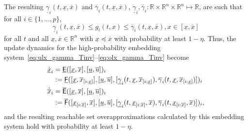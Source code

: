 \documentclass{IEEEojcsys}
\newcommand{\ul}{\underline}
\newcommand{\ol}{\overline}
\begin{document}
The resulting $\ul{\gamma}_i(t, \ul{x}, \ol{x})$ and $\ol{\gamma}_i(t, \ul{x}, \ol{x})$, $\ul{\gamma}_i, \ol{\gamma}_i: \mathbb{R} \times \mathbb{R}^n\times\mathbb{R}^n\mapsto\mathbb{R}$, are such that for all $i\in\{1,\ldots,p\}$, 
\begin{equation}
\label{eq:GPbound}
    \ul{\gamma}_i(t, \ul{x},\ol{x}) \leq g_i(t, x) \leq \ol{\gamma}_i(t, \ul{x}, \ol{x}), x \in [\ul{x}, \ol{x}] 
\end{equation}
for all $t$ and all $\ul{x}, \ol{x}\in\mathbb{R}^n$ with $\ul{x}\preceq \ol{x}$ with probability at least $1-\eta$. Thus, the update dynamics for the high-probability embedding system~\eqref{eq:ulx_gamma_Tinv}--\eqref{eq:olx_gamma_Tinv} become
\begin{align}
    \dot{\ul{x}}_i&= \ul{\sfE}([\ul{x}, \ol{x}], [\ul{u}, \ol{u}])_i \label{eq:ulx_gamma}\\
    &:= \ul{\sfF}([\ul{x}, \ol{x}_{[i:\ul{x}]}], [\ul{u}, \ol{u}], [\ul{\gamma}_i(t, \ul{x}, \ol{x}_{[i:\ul{x}]}), \ol{\gamma}_i(t, \ul{x}, \ol{x}_{[i:\ul{x}]})])_i\nonumber\\
    \dot{\ol{x}}_i&= \ol{\sfE}([\ul{x}, \ol{x}], [\ul{u}, \ol{u}])_i \label{eq:olx_gamma}\\
    &:= \ol{\sfF}([\ul{x}_{[i:\ol{x}]}, \ol{x}], [\ul{u}, \ol{u}], [\ul{\gamma}_i(t, \ul{x}_{[i:\ol{x}]}, \ol{x}), \ol{\gamma}_i(t, \ul{x}_{[i:\ol{x}]}, \ol{x})])_i,\nonumber
\end{align}
and the resulting reachable set overapproximations calculated by this embedding system hold with probability at least $1-\eta$.
\end{document}
